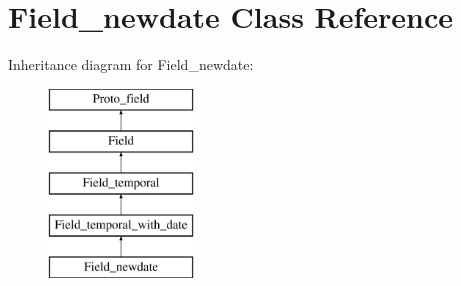 \hypertarget{classField__newdate}{}\section{Field\+\_\+newdate Class Reference}
\label{classField__newdate}
Inheritance diagram for Field\+\_\+newdate\+:\begin{figure}[H]
\begin{center}
\leavevmode
\includegraphics[height=5.000000cm]{classField__newdate}
\end{center}
\end{figure}
